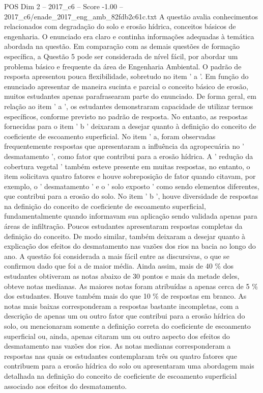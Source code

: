 \begin{textsample}{POS Dim 2 – 2017\_c6 – Score -1.00 – 2017\_c6/enade\_2017\_eng\_amb\_82fdb2c61c.txt}
A questão avalia conhecimentos relacionados com degradação do solo e erosão hídrica, conceitos básicos de engenharia.
O enunciado era claro e continha informações adequadas à temática abordada na questão.
Em comparação com as demais questões de formação específica, a Questão 5 pode ser considerada de nível fácil, por abordar um problema básico e frequente da área de Engenharia Ambiental.
O padrão de resposta apresentou pouca flexibilidade, sobretudo no item ' a '.
Em função do enunciado apresentar de maneira sucinta e parcial o conceito básico de erosão, muitos estudantes apenas parafrasearam parte do enunciado.
De forma geral, em relação ao item ' a ', os estudantes demonstraram capacidade de utilizar termos específicos, conforme previsto no padrão de resposta.
No entanto, as respostas fornecidas para o item ' b ' deixaram a desejar quanto à definição do conceito de coeficiente de escoamento superficial.
No item ' a, foram observadas frequentemente respostas que apresentaram a influência da agropecuária no ' desmatamento ', como fator que contribui para a erosão hídrica.
A ' redução da cobertura vegetal ' também esteve presente em muitas respostas, no entanto, o item solicitava quatro fatores e houve sobreposição de fator quando citavam, por exemplo, o ' desmatamento ' e o ' solo exposto ' como sendo elementos diferentes, que contribui para a erosão do solo.
No item ' b ', houve diversidade de respostas na definição do conceito de coeficiente de escoamento superficial, fundamentalmente quando informavam sua aplicação sendo validada apenas para áreas de infiltração.
Poucos estudantes apresentaram respostas completas da definição do conceito.
De modo similar, também deixaram a desejar quanto à explicação dos efeitos do desmatamento nas vazões dos rios na bacia ao longo do ano.
A questão foi considerada a mais fácil entre as discursivas, o que se confirmou dado que foi a de maior média.
Ainda assim, mais de 40 \% dos estudantes obtiveram as notas abaixo de 30 pontos e mais da metade deles, obteve notas medianas.
As maiores notas foram atribuídas a apenas cerca de 5 \% dos estudantes.
Houve também mais do que 10 \% de respostas em branco.
As notas mais baixas corresponderam a respostas bastante incompletas, com a descrição de apenas um ou outro fator que contribui para a erosão hídrica do solo, ou mencionaram somente a definição correta do coeficiente de escoamento superficial ou, ainda, apenas citaram um ou outro aspecto dos efeitos do desmatamento nas vazões dos rios.
As notas medianas corresponderam a respostas nas quais os estudantes contemplaram três ou quatro fatores que contribuem para a erosão hídrica do solo ou apresentaram uma abordagem mais detalhada na definição do conceito de coeficiente de escoamento superficial associado aos efeitos do desmatamento.

\end{textsample}
